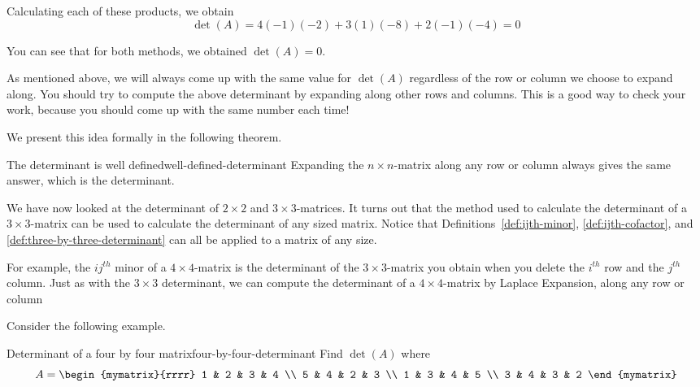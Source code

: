 \begin{solution}
Calculating each of these products, we obtain
\begin{equation*}
\det (A)
=
4(-1)(-2) 
+
3(1)(-8) 
+
2 (-1)(-4)
=
0
\end{equation*}

You can see that for both methods, we obtained $\det (A) = 0$. 
\end{solution}

As mentioned above, we will always come up with the same value for $\det (A)$ regardless of the row or column 
we choose to expand along. You should try to compute the above determinant by expanding along other
rows and columns. This is a good way to check your work, because you should come up 
with the same number each time!  

We present this idea formally in the following theorem.

\begin{theorem}{The determinant is well defined}{well-defined-determinant}
Expanding the $n\times n$-matrix along any row or column always gives the
same answer, which is the determinant.
\end{theorem}

We have now looked at the determinant of $2 \times 2$ and $3 \times 3$-matrices. It turns
out that the method used to calculate the determinant of a $3 \times 3$-matrix 
can be used to calculate the determinant of any sized matrix. Notice that
Definitions~\ref{def:ijth-minor}, {\ref{def:ijth-cofactor}}, and {\ref{def:three-by-three-determinant}}
can all be applied to a matrix of any size. 

For example, the $ij^{th}$ minor of a $4 \times 4$-matrix is the determinant
of the $3 \times 3$-matrix you obtain when you delete the $i^{th}$ row and the $j^{th}$ column. 
Just as with the $3 \times 3$ determinant, we can compute the determinant of a $4 \times 4$-matrix by Laplace Expansion, 
along any row or column

Consider the following example. 

\begin{example}{Determinant of a four by four matrix}{four-by-four-determinant}
Find $\det (A) $ where
\begin{equation*}
A=\begin{mymatrix}{rrrr}
1 & 2 & 3 & 4 \\
5 & 4 & 2 & 3 \\
1 & 3 & 4 & 5 \\
3 & 4 & 3 & 2
\end{mymatrix}
\end{equation*}
\end{example}

